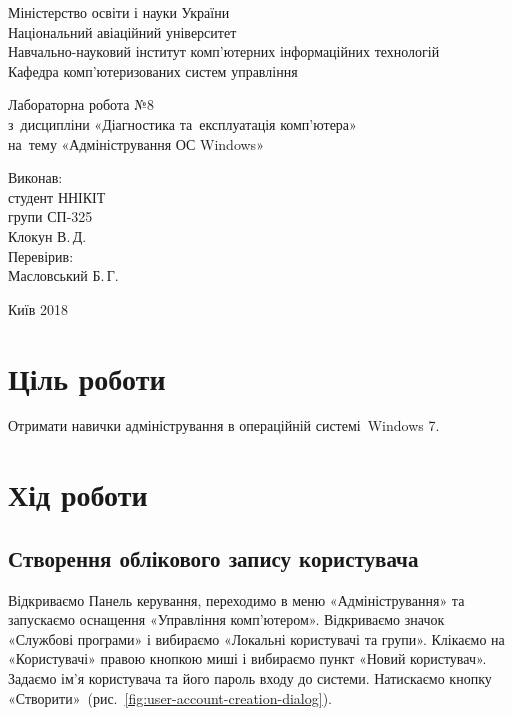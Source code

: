 \documentclass[
	a4paper,
	oneside,
	DIV = 12,
	fontsize = 13pt,
	headings = normal,
]{scrartcl}
\newlength{\gridunitwidth}
\newcommand{\allcaps}[1]{{\addfontfeatures{LetterSpace = 5}#1}}
\begin{document}
\setlength{\gridunitwidth}{\textwidth / 12}
	\begin{titlepage}
		\begin{center}
			Міністерство освіти і науки України\\
			Національний авіаційний університет\\
			Навчально-науковий інститут комп'ютерних інформаційних технологій\\
			Кафедра комп'ютеризованих систем управління

			\vspace{\fill}
				Лабораторна робота №8\\
				з~дисципліни «Діагностика та~експлуатація комп'ютера»\\
				на~тему «Адміністрування ОС \textenglish{Windows}»\\

			\vspace{\fill}

			\begin{flushright}
				Виконав:\\
				студент \allcaps{ННІКІТ}\\
				групи СП-325\\
				Клокун В.\,Д.\\
				Перевірив:\\
				Масловський Б.\,Г.
			\end{flushright}

			Київ 2018
		\end{center}
	\end{titlepage}

	\section{Ціль роботи}
		Отримати навички адміністрування в операційній системі~\textenglish{Windows 7}.


	\section{Хід роботи}
		\subsection{Створення облікового запису користувача}
			Відкриваємо Панель керування, переходимо в меню «Адміністрування» та запускаємо оснащення «Управління комп'ютером». Відкриваємо значок «Службові програми» і вибираємо «Локальні користувачі та групи». Клікаємо на «Користувачі» правою кнопкою миші і вибираємо пункт «Новий користувач». Задаємо ім'я користувача та його пароль входу до системи. Натискаємо кнопку «Створити»~(рис.~\ref{fig:user-account-creation-dialog}).
\end{document}
